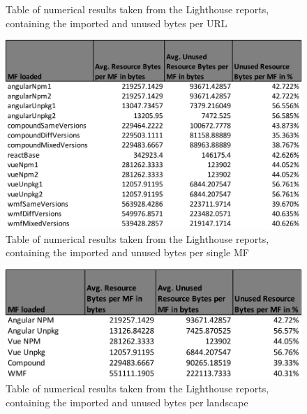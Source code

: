 \begin{figure}[!h]
\begin{adjustbox}{width=\textwidth,totalheight=0.7\textheight}
	\end{adjustbox}
	\caption{Table of numerical results taken from the Lighthouse reports, containing the imported and unused bytes per URL}
	\label{fig:appendix_2_1}
\end{figure}
\newpage
\begin{figure}[!h]
	\centering
	\begin{adjustbox}{width=\textwidth}
		\includegraphics[]{Figures/lighthouse_json_2.pdf}
	\end{adjustbox}
	\caption{Table of numerical results taken from the Lighthouse reports, containing the imported and unused bytes per single MF}
	\label{fig:appendix_2_2}
\end{figure}



\begin{figure}[!h]
	\centering
	\begin{adjustbox}{width=\textwidth}
		\includegraphics[]{Figures/lighthouse_json_3.pdf}
	\end{adjustbox}
	\caption{Table of numerical results taken from the Lighthouse reports, containing the imported and unused bytes per landscape}
	\label{fig:appendix_2_3}
\end{figure}